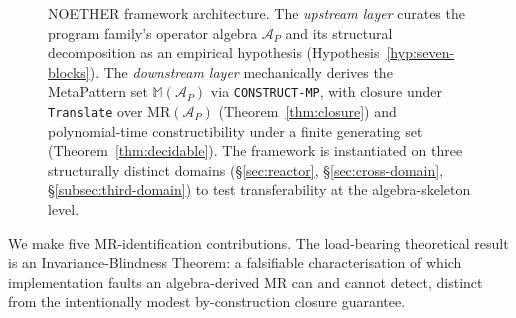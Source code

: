 \documentclass[manuscript]{acmart}
\begin{document}
\begin{figure}[h]
{%
}
\caption{NOETHER framework architecture. The
\emph{upstream layer} curates the program family's operator algebra
$\mathcal{A}_P$ and its structural decomposition as an empirical
hypothesis (Hypothesis~\ref{hyp:seven-blocks}). The \emph{downstream
layer} mechanically derives the MetaPattern set
$\mathbb{M}(\mathcal{A}_P)$ via \texttt{CONSTRUCT-MP}, with closure
under \texttt{Translate} over $\mathrm{MR}(\mathcal{A}_P)$
(Theorem~\ref{thm:closure}) and polynomial-time constructibility under a
finite generating set (Theorem~\ref{thm:decidable}). The framework
is instantiated on three structurally distinct domains
(\S\ref{sec:reactor}, \S\ref{sec:cross-domain}, \S\ref{subsec:third-domain})
to test transferability at the algebra-skeleton level.}
\label{fig:noether-arch}
\end{figure}

We make five MR-identification contributions. The load-bearing theoretical result is an Invariance-Blindness Theorem: a falsifiable characterisation of which implementation faults an algebra-derived MR can and cannot detect, distinct from the intentionally modest by-construction closure guarantee.
\end{document}
